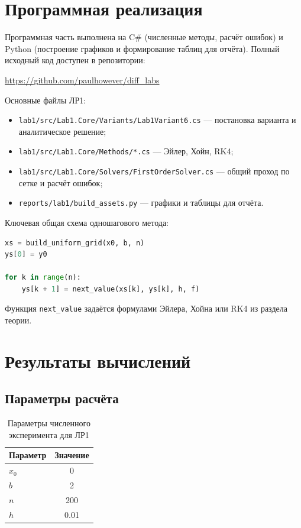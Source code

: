 \documentclass[12pt,a4paper]{article}
\begin{document}
\section{Программная реализация}
Программная часть выполнена на C\# (численные методы, расчёт ошибок) и Python (построение графиков и формирование таблиц для отчёта). Полный исходный код доступен в репозитории:

\begin{center}
\url{https://github.com/paulhowever/diff_labs}
\end{center}

Основные файлы ЛР1:
\begin{itemize}
\item \texttt{lab1/src/Lab1.Core/Variants/Lab1Variant6.cs} --- постановка варианта и аналитическое решение;
\item \texttt{lab1/src/Lab1.Core/Methods/*.cs} --- Эйлер, Хойн, RK4;
\item \texttt{lab1/src/Lab1.Core/Solvers/FirstOrderSolver.cs} --- общий проход по сетке и расчёт ошибок;
\item \texttt{reports/lab1/build\_assets.py} --- графики и таблицы для отчёта.
\end{itemize}

Ключевая общая схема одношагового метода:
\begin{lstlisting}[language=Python, caption={Общая схема одношагового численного метода}]
xs = build_uniform_grid(x0, b, n)
ys[0] = y0

for k in range(n):
    ys[k + 1] = next_value(xs[k], ys[k], h, f)
\end{lstlisting}

Функция \texttt{next\_value} задаётся формулами Эйлера, Хойна или RK4 из раздела теории.

\section{Результаты вычислений}
\subsection{Параметры расчёта}
\begin{table}[H]
\centering
\begin{tabular}{lc}
\toprule
Параметр & Значение \\
\midrule
$x_0$ & 0 \\
$b$ & 2 \\
$n$ & 200 \\
$h$ & 0.01 \\
\bottomrule
\end{tabular}
\caption{Параметры численного эксперимента для ЛР1}
\label{tab:lab1_params}
\end{table}
\end{document}
